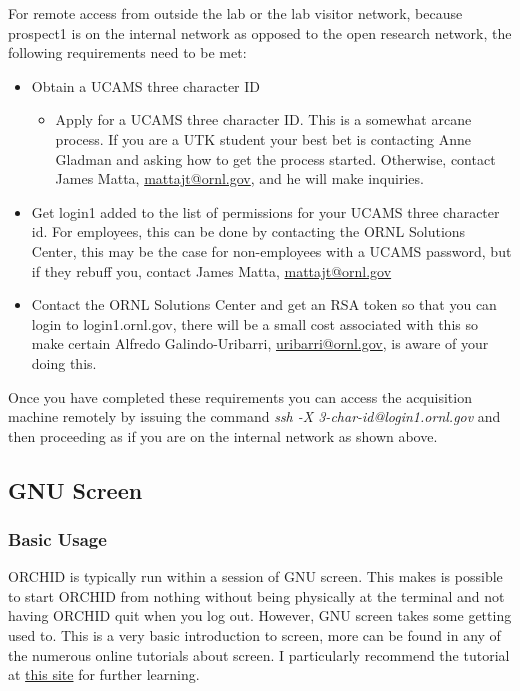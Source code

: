 \documentclass[onecolumn, 10pt, letterpaper, twoside]{article}
\begin{document}
For remote access from outside the lab or the lab visitor network, because prospect1 is on the internal network as opposed to the open research network, the following requirements need to be met:
\begin{itemize}
\item Obtain a UCAMS three character ID
\begin{itemize}
\item Apply for a UCAMS three character ID. This is a somewhat arcane process. If you are a UTK student your best bet is contacting Anne Gladman and asking how to get the process started. Otherwise, contact James Matta, \href{mailto:mattajt@ornl.gov}{mattajt@ornl.gov}, and he will make inquiries.
\end{itemize}
\item Get login1 added to the list of permissions for your UCAMS three character id. For employees, this can be done by contacting the ORNL Solutions Center, this may be the case for non-employees with a UCAMS password, but if they rebuff you, contact James Matta, \href{mailto:mattajt@ornl.gov}{mattajt@ornl.gov}
\item Contact the ORNL Solutions Center and get an RSA token so that you can login to login1.ornl.gov, there will be a small cost associated with this so make certain Alfredo Galindo-Uribarri, \href{mailto:uribarri@ornl.gov}{uribarri@ornl.gov}, is aware of your doing this.
\end{itemize}

Once you have completed these requirements you can access the acquisition machine remotely by issuing the command \emph{ssh -X 3-char-id@login1.ornl.gov} and then proceeding as if you are on the internal network as shown above.

\subsection{GNU Screen}
\subsubsection{Basic Usage}
ORCHID is typically run within a session of GNU screen. This makes is possible to start ORCHID from nothing without being physically at the terminal and not having ORCHID quit when you log out. However, GNU screen takes some getting used to. This is a very basic introduction to screen, more can be found in any of the numerous online tutorials about screen. I particularly recommend the tutorial at \href{https://www.linode.com/docs/networking/ssh/using-gnu-screen-to-manage-persistent-terminal-sessions}{this site} for further learning.
\end{document}

